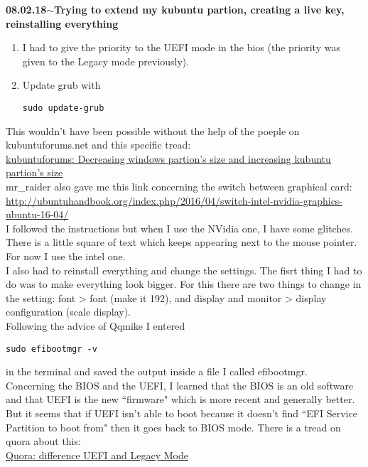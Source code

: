 \documentclass[11pt,a4paper]{article}
\newenvironment{loggentry}[2]%
{\noindent\textbf{#1}\hspace{1cm}$\mathbf{\sim}$\text{ }\textbf{#2}\\}{\vspace{0.5cm}}
\begin{document}
\begin{loggentry}{08.02.18}{Trying to extend my kubuntu partion, creating a live key, reinstalling everything}
\begin{enumerate}
\item I had to give the priority to the UEFI mode in the bios (the priority was given to the Legacy mode previously).
\item Update grub with
\begin{verbatim}
sudo update-grub
\end{verbatim}
\end{enumerate}
This wouldn't have been possible without the help of the poeple on kubuntuforums.net and this specific tread:\\
\href{https://www.kubuntuforums.net/showthread.php/72976-Decreasing-windows-partition-s-size-and-increasing-kubuntu-partition-s-size}{kubuntuforums: Decreasing windows partion's size and increasing kubuntu partion's size}\\
mr\_raider also gave me this link concerning the switch between graphical card:\\
\url{http://ubuntuhandbook.org/index.php/2016/04/switch-intel-nvidia-graphics-ubuntu-16-04/}\\
I followed the instructions but when I use the NVidia one, I have some glitches. There is a little square of text which keeps appearing next to the mouse pointer. For now I use the intel one.\\
I also had to reinstall everything and change the settings. The fisrt thing I had to do was to make everything look bigger. For this there are two things to change in the setting: font > font (make it 192), and display and monitor > display configuration (scale display).\\
Following the advice of Qqmike I entered 
\begin{verbatim}
sudo efibootmgr -v
\end{verbatim}
in the terminal and saved the output inside a file I called efibootmgr.\\

Concerning the BIOS and the UEFI, I learned that the BIOS is an old software and that UEFI is the new ``firmware" which is more recent and generally better. But it seems that if UEFI isn't able to boot because it doesn't find ``EFI Service Partition to boot from" then it goes back to BIOS mode. There is a tread on quora about this:\\
\href{https://www.quora.com/What-is-the-difference-between-UEFI-and-Legacy-Mode-which-we-need-to-choose-while-installing-the-OS}{Quora: difference UEFI and Legacy Mode}
\end{loggentry}
\end{document}

